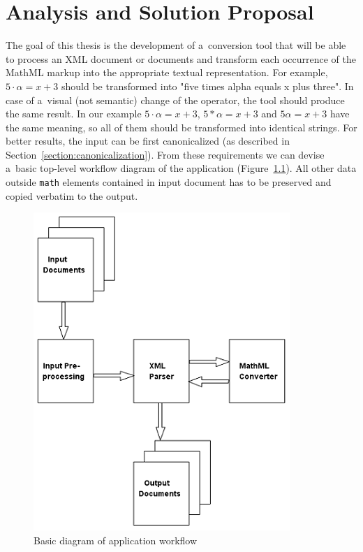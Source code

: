 \documentclass[11pt,oneside,final]{fithesis2}
\begin{document}
\chapter{Analysis and Solution Proposal}
\label{chapter:analysis}
The goal of this thesis is the development of a~conversion tool that will be able to process an XML document or documents and transform each occurrence of the MathML markup into the appropriate textual representation. For example, $5 \cdot \alpha = x + 3$ should be transformed into "five times alpha equals x plus three". In case of a~visual (not semantic) change of the operator, the tool should produce the same result. In our example $5 \cdot \alpha = x + 3$, $5 * \alpha = x + 3$ and $5\alpha = x + 3$ have the same meaning, so all of them should be transformed into identical strings. For better results, the input can be first canonicalized (as described in Section~\ref{section:canonicalization}). From these requirements we can devise a~basic top-level workflow diagram of the application (Figure~\ref{fig:basicworkflow}). All other data outside \texttt{math} elements contained in input document has to be preserved and copied verbatim to the output.

\begin{figure}[!ht]
\centering
\includegraphics{basic_diagram}
\caption{Basic diagram of application workflow}
\label{fig:basicworkflow}
\end{figure}
\end{document}
